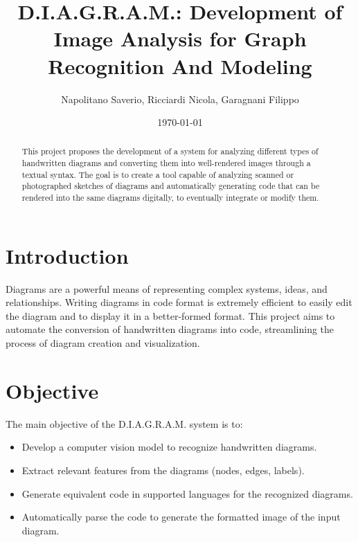 \documentclass[a4paper,12pt]{article}
\title{D.I.A.G.R.A.M.: Development of Image Analysis for Graph Recognition And Modeling}
\author{Napolitano Saverio, Ricciardi Nicola, Garagnani Filippo}
\date{\today}
\begin{document}
\maketitle

\begin{abstract}
    This project proposes the development of a system for analyzing different types of handwritten diagrams and converting them into well-rendered images through a textual syntax. The goal is to create a tool capable of analyzing scanned or photographed sketches of diagrams and automatically generating code that can be rendered into the same diagrams digitally, to eventually integrate or modify them.
\end{abstract}

\section{Introduction}
    Diagrams are a powerful means of representing complex systems, ideas, and relationships. Writing diagrams in code format is extremely efficient to easily edit the diagram and to display it in a better-formed format. This project aims to automate the conversion of handwritten diagrams into code, streamlining the process of diagram creation and visualization.

\section{Objective}
    The main objective of the D.I.A.G.R.A.M. system is to:
    \begin{itemize}
        \item Develop a computer vision model to recognize handwritten diagrams.
        \item Extract relevant features from the diagrams (nodes, edges, labels).
        \item Generate equivalent code in supported languages for the recognized diagrams.
        \item Automatically parse the code to generate the formatted image of the input diagram.
    \end{itemize}
    
\end{document}
